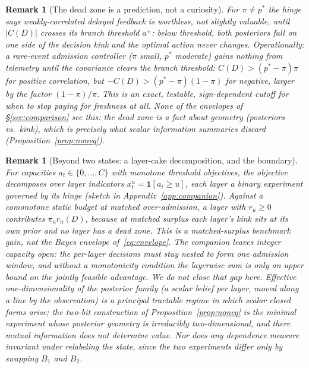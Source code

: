 \documentclass[11pt]{article}
\newtheorem{remark}[theorem]{Remark}
\begin{document}
\begin{remark}[The dead zone is a prediction, not a curiosity]
For $\pi\neq p^*$ the hinge says weakly-correlated delayed feedback is
\emph{worthless}, not slightly valuable, until $|C(D)|$ crosses
its branch threshold $a^{\pm}$: below threshold, both posteriors fall on one side of the decision
kink and the optimal action never changes. Operationally: a rare-event
admission controller ($\pi$ small, $p^*$ moderate) gains \emph{nothing}
from telemetry until the covariance clears the \emph{branch} threshold:
$C(D)>(p^*-\pi)\pi$ for positive correlation, but
$-C(D)>(p^*-\pi)(1-\pi)$ for negative, larger by the factor
$(1-\pi)/\pi$. This is an exact, testable, sign-dependent cutoff for
when to stop paying for freshness at all. None of the envelopes of \S\ref{sec:comparison} see
this: the dead zone is a fact about geometry (posteriors vs.\ kink), which
is precisely what scalar information summaries discard
(Proposition~\ref{prop:noneq}).
\end{remark}

\begin{remark}[Beyond two states: a layer-cake decomposition, and the boundary]
For capacities $a_t\in\{0,\dots,C\}$ with monotone threshold objectives, the
objective decomposes over layer indicators $x^u_t=\mathbf 1[a_t\ge u]$, each
layer a binary experiment governed by its hinge (sketch in
Appendix~\ref{app:companion}). Against a comonotone static budget at matched
over-admission, a layer with $r_u\ge0$ contributes $\pi_u r_u(D)$, because
at matched surplus each layer's kink sits at its own prior and no layer has a
dead zone. This is a matched-surplus benchmark gain, not the Bayes envelope
of~\eqref{eq:envelope}. The companion leaves integer capacity open: the
per-layer decisions must stay nested to form one admission window, and
without a monotonicity condition the layerwise sum is only an upper bound
on the jointly feasible advantage. We do not close that gap here.
Effective one-dimensionality of the posterior family (a scalar belief
per layer, moved along a line by the observation) is a principal
tractable regime in which scalar closed forms arise; the
two-bit construction of Proposition~\ref{prop:noneq} is the minimal
experiment whose posterior geometry is irreducibly two-dimensional, and there
mutual information does not determine value. Nor does any dependence
measure invariant under relabeling the state, since the two experiments
differ only by swapping $B_1$ and $B_2$.
\end{remark}
\end{document}
